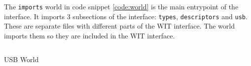 The \texttt{imports} world in code snippet \ref{code:world} is the main entrypoint of the interface. It imports 3 subsections of the interface: \texttt{types}, \texttt{descriptors} and \texttt{usb}. These are separate files with different parts of the WIT interface. The world imports them so they are included in the WIT interface.\\

\begin{code}
\inputminted{yaml}{wit/world.wit}
\caption{USB World}
\label{code:world}
\end{code}

% 
% 
% 
% 
% 
% 
% 
% 

